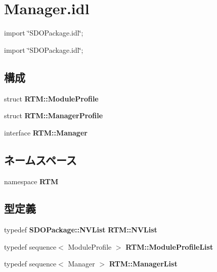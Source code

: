 \section{Manager.idl}
\label{Manager_8idl}
{\ttfamily import \char`\"{}SDOPackage.idl\char`\"{};}\par
{\ttfamily import \char`\"{}SDOPackage.idl\char`\"{};}\par
\subsection*{構成}
\begin{DoxyCompactItemize}
\item 
struct {\bf RTM::ModuleProfile}
\item 
struct {\bf RTM::ManagerProfile}
\item 
interface {\bf RTM::Manager}
\end{DoxyCompactItemize}
\subsection*{ネームスペース}
\begin{DoxyCompactItemize}
\item 
namespace {\bf RTM}
\end{DoxyCompactItemize}
\subsection*{型定義}
\begin{DoxyCompactItemize}
\item 
typedef {\bf SDOPackage::NVList} {\bf RTM::NVList}
\item 
typedef sequence$<$ ModuleProfile $>$ {\bf RTM::ModuleProfileList}
\item 
typedef sequence$<$ Manager $>$ {\bf RTM::ManagerList}
\end{DoxyCompactItemize}
